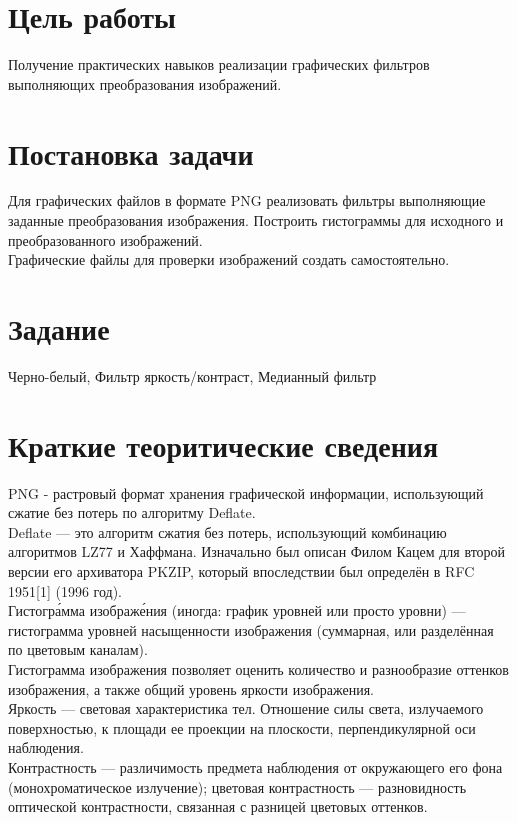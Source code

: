 \documentclass[russian,a4paper,12pt]{scrartcl}
\begin{document}
	\section{Цель работы}
			Получение практических навыков реализации графических фильтров выполняющих преобразования изображений.
	\section{Постановка задачи}
			Для графических файлов в формате PNG реализовать фильтры выполняющие заданные преобразования изображения. Построить гистограммы для исходного и преобразованного изображений.\\
			Графические файлы для проверки изображений создать самостоятельно.
	\section{Задание}
			Черно-белый, Фильтр яркость/контраст, Медианный фильтр
	\section{Краткие теоритические сведения}
			PNG - растровый формат хранения графической информации, использующий сжатие без потерь по алгоритму Deflate.\\
			Deflate — это алгоритм сжатия без потерь, использующий комбинацию алгоритмов LZ77 и Хаффмана. Изначально был описан Филом Кацем для второй версии его архиватора PKZIP, который впоследствии был определён в RFC 1951[1] (1996 год).\\
			Гистогра́мма изображе́ния (иногда: график уровней или просто уровни) — гистограмма уровней насыщенности изображения (суммарная, или разделённая по цветовым каналам).\\

			Гистограмма изображения позволяет оценить количество и разнообразие оттенков изображения, а также общий уровень яркости изображения.\\
			Яркость — световая характеристика тел. Отношение силы света, излучаемого поверхностью, к площади ее проекции на плоскости, перпендикулярной оси наблюдения.\\
			Контрастность — различимость предмета наблюдения от окружающего его фона (монохроматическое излучение); цветовая контрастность — разновидность оптической контрастности, связанная с разницей цветовых оттенков.\\
			
\end{document}
